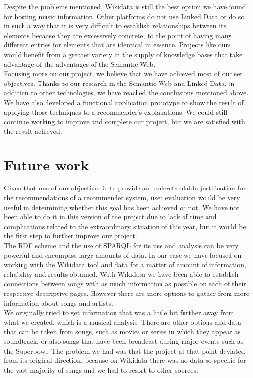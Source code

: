 Despite the problems mentioned, Wikidata is still the best option we have found for hosting music information. Other platforms do not use Linked Data or do so in such a way that it is very difficult to establish relationships between its elements because they are excessively concrete, to the point of having many different entries for elements that are identical in essence. Projects like ours would benefit from a greater variety in the supply of knowledge bases that take advantage of the advantages of the Semantic Web.\\

Focusing more on our project, we believe that we have achieved most of our set objectives. Thanks to our research in the Semantic Web and Linked Data, in addition to other technologies, we have reached the conclusions mentioned above. We have also developed a functional application prototype to show the result of applying those techniques to a recommender’s explanations. We could still continue working to improve and complete our project, but we are satisfied with the result achieved.\\

\section{Future work}

Given that one of our objectives is to provide an understandable justification for the recommendations of a recommender system, user evaluation would be very useful in determining whether this goal has been achieved or not. We have not been able to do it in this version of the project due to lack of time and complications related to the extraordinary situation of this year, but it would be the first step to further improve our project.\\

The RDF scheme and the use of SPARQL for its use and analysis can be very powerful and encompass large amounts of data. In our case we have focused on working with the Wikidata tool and data for a matter of amount of information, reliability and results obtained. With Wikidata we have been able to establish connections between songs with as much information as possible on each of their respective descriptive pages. However there are more options to gather from more information about songs and artists.\\

We originally tried to get information that was a little bit further away from what we created, which is a musical analysis. There are other options and data that can be taken from songs, such as movies or series in which they appear as soundtrack, or also songs that have been broadcast during major events such as the Superbowl. The problem we had was that the project at that point deviated from its original direction, because on Wikidata there was no data so specific for the vast majority of songs and we had to resort to other sources.\\

